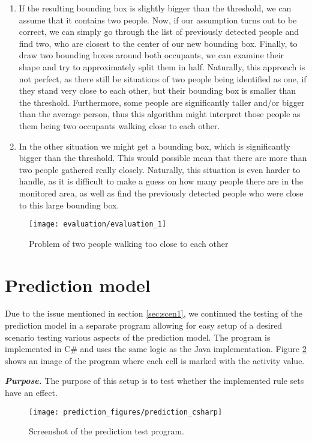 \begin{enumerate}
\item If the resulting bounding box is slightly bigger than the threshold, we can assume that it contains two people. Now, if our assumption turns out to be correct, we can simply go through the list of previously detected people and find two, who are closest to the center of our new bounding box. Finally, to draw two bounding boxes around both occupants, we can examine their shape and try to approximately split them in half. Naturally, this approach is not perfect, as there still be situations of two people being identified as one, if they stand very close to each other, but their bounding box is smaller than the threshold. Furthermore, some people are significantly taller and/or bigger than the average person, thus this algorithm might interpret those people as them being two occupants walking close to each other.
\item In the other situation we might get a bounding box, which is significantly bigger than the threshold. This would possible mean that there are more than two people gathered really closely. Naturally, this situation is even harder to handle, as it is difficult to make a guess on how many people there are in the monitored area, as well as find the previously detected people who were close to this large bounding box.
\end{enumerate}

\begin{figure}[htb]
	\centering
	\texttt{[image: evaluation/evaluation\_1]}
	\caption{Problem of two people walking too close to each other}
	\label{fig:evaluation_1}
\end{figure}

\section{Prediction model}
\label{eval_prediction}
Due to the issue mentioned in section \ref{sec:scen1}, we continued the testing of the prediction model in a separate program allowing for easy setup of a desired scenario testing various aspects of the prediction model. The program is implemented in C\# and uses the same logic as the Java implementation. Figure \ref{fig:pred_c} shows an image of the program where each cell is marked with the activity value. 

\textit{\textbf{Purpose.}} The purpose of this setup is to test whether the implemented rule sets have an effect.
\begin{figure}[htb]
	\centering
	\texttt{[image: prediction\_figures/prediction\_csharp]}
	\caption{Screenshot of the prediction test program.}
	\label{fig:pred_c}
\end{figure}

